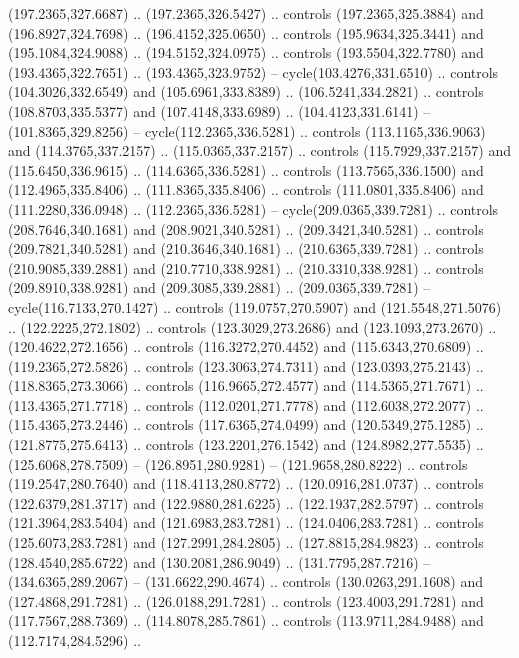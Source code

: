\begin{scope}[cm={{1.25,0.0,0.0,-1.25,(0.0,743.43331)}}]
    (197.2365,327.6687) .. (197.2365,326.5427) .. controls (197.2365,325.3884) and
    (196.8927,324.7698) .. (196.4152,325.0650) .. controls (195.9634,325.3441) and
    (195.1084,324.9088) .. (194.5152,324.0975) .. controls (193.5504,322.7780) and
    (193.4365,322.7651) .. (193.4365,323.9752) -- cycle(103.4276,331.6510) ..
    controls (104.3026,332.6549) and (105.6961,333.8389) .. (106.5241,334.2821) ..
    controls (108.8703,335.5377) and (107.4148,333.6989) .. (104.4123,331.6141) --
    (101.8365,329.8256) -- cycle(112.2365,336.5281) .. controls
    (113.1165,336.9063) and (114.3765,337.2157) .. (115.0365,337.2157) .. controls
    (115.7929,337.2157) and (115.6450,336.9615) .. (114.6365,336.5281) .. controls
    (113.7565,336.1500) and (112.4965,335.8406) .. (111.8365,335.8406) .. controls
    (111.0801,335.8406) and (111.2280,336.0948) .. (112.2365,336.5281) --
    cycle(209.0365,339.7281) .. controls (208.7646,340.1681) and
    (208.9021,340.5281) .. (209.3421,340.5281) .. controls (209.7821,340.5281) and
    (210.3646,340.1681) .. (210.6365,339.7281) .. controls (210.9085,339.2881) and
    (210.7710,338.9281) .. (210.3310,338.9281) .. controls (209.8910,338.9281) and
    (209.3085,339.2881) .. (209.0365,339.7281) -- cycle(116.7133,270.1427) ..
    controls (119.0757,270.5907) and (121.5548,271.5076) .. (122.2225,272.1802) ..
    controls (123.3029,273.2686) and (123.1093,273.2670) .. (120.4622,272.1656) ..
    controls (116.3272,270.4452) and (115.6343,270.6809) .. (119.2365,272.5826) ..
    controls (123.3063,274.7311) and (123.0393,275.2143) .. (118.8365,273.3066) ..
    controls (116.9665,272.4577) and (114.5365,271.7671) .. (113.4365,271.7718) ..
    controls (112.0201,271.7778) and (112.6038,272.2077) .. (115.4365,273.2446) ..
    controls (117.6365,274.0499) and (120.5349,275.1285) .. (121.8775,275.6413) ..
    controls (123.2201,276.1542) and (124.8982,277.5535) .. (125.6068,278.7509) --
    (126.8951,280.9281) -- (121.9658,280.8222) .. controls (119.2547,280.7640) and
    (118.4113,280.8772) .. (120.0916,281.0737) .. controls (122.6379,281.3717) and
    (122.9880,281.6225) .. (122.1937,282.5797) .. controls (121.3964,283.5404) and
    (121.6983,283.7281) .. (124.0406,283.7281) .. controls (125.6073,283.7281) and
    (127.2991,284.2805) .. (127.8815,284.9823) .. controls (128.4540,285.6722) and
    (130.2081,286.9049) .. (131.7795,287.7216) -- (134.6365,289.2067) --
    (131.6622,290.4674) .. controls (130.0263,291.1608) and (127.4868,291.7281) ..
    (126.0188,291.7281) .. controls (123.4003,291.7281) and (117.7567,288.7369) ..
    (114.8078,285.7861) .. controls (113.9711,284.9488) and (112.7174,284.5296) ..

\end{scope}
